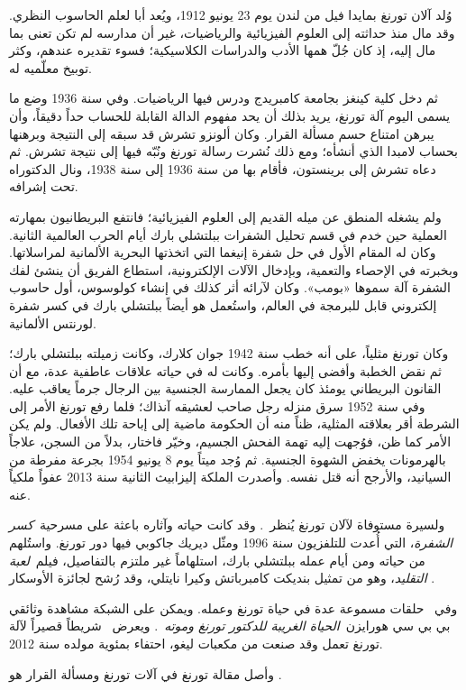 \documentclass[../../../include/open-logic-section]{subfiles}
\begin{document}


وُلد آلان تورنغ بمايدا فيل من لندن يوم 23 يونيو 1912، ويُعد أبا لعلم
الحاسوب النظري. وقد مال منذ حداثته إلى العلوم الفيزيائية والرياضيات، غير
أن مدارسه لم تكن تعنى بما مال إليه، إذ كان جُلّ همها الأدب والدراسات
الكلاسيكية؛ فسوء تقديره عندهم، وكثر توبيخ معلّميه له.


ثم دخل كلية كينغز بجامعة كامبريدج ودرس فيها الرياضيات. وفي سنة 1936 وضع
ما يسمى اليوم آلة تورنغ، يريد بذلك أن يحد مفهوم الدالة القابلة للحساب حداً
دقيقاً، وأن يبرهن امتناع حسم مسألة القرار. وكان ألونزو تشرش قد سبقه إلى
النتيجة وبرهنها بحساب لامبدا الذي أنشأه؛ ومع ذلك نُشرت رسالة تورنغ ونُبّه
فيها إلى نتيجة تشرش. ثم دعاه تشرش إلى برينستون، فأقام بها من سنة 1936 إلى
سنة 1938، ونال الدكتوراه تحت إشرافه.

ولم يشغله المنطق عن ميله القديم إلى العلوم الفيزيائية؛ فانتفع البريطانيون
بمهارته العملية حين خدم في قسم تحليل الشفرات ببلتشلي بارك أيام الحرب
العالمية الثانية. وكان له المقام الأول في حل شفرة إنيغما التي اتخذتها
البحرية الألمانية لمراسلاتها. وبخبرته في الإحصاء والتعمية، وبإدخال الآلات
الإلكترونية، استطاع الفريق أن ينشئ لفك الشفرة آلة سموها «بومب». وكان
لآرائه أثر كذلك في إنشاء كولوسوس، أول حاسوب إلكتروني قابل للبرمجة في
العالم، واستُعمل هو أيضاً ببلتشلي بارك في كسر شفرة لورنتس الألمانية.

وكان تورنغ مثلياً، على أنه خطب سنة 1942 جوان كلارك، وكانت زميلته ببلتشلي
بارك؛ ثم نقض الخطبة وأفضى إليها بأمره. وكانت له في حياته علاقات عاطفية
عدة، مع أن القانون البريطاني يومئذ كان يجعل الممارسة الجنسية بين الرجال
جرماً يعاقب عليه. وفي سنة 1952 سرق منزله رجل صاحب لعشيقه آنذاك؛ فلما رفع
تورنغ الأمر إلى الشرطة أقر بعلاقته المثلية، ظناً منه أن الحكومة ماضية إلى
إباحة تلك الأفعال. ولم يكن الأمر كما ظن، فوُجهت إليه تهمة الفحش الجسيم،
وخيّر فاختار، بدلاً من السجن، علاجاً بالهرمونات يخفض الشهوة الجنسية. ثم
وُجد ميتاً يوم 8 يونيو 1954 بجرعة مفرطة من السيانيد، والأرجح أنه قتل نفسه.
وأصدرت الملكة إليزابيث الثانية سنة 2013 عفواً ملكياً عنه.

\begin{reading}
ولسيرة مستوفاة لآلان تورنغ يُنظر~\citet{Hodges2014}. وقد كانت حياته وآثاره
باعثة على مسرحية~\emph{كسر الشفرة}، التي أُعدت للتلفزيون سنة 1996 ومثّل
ديريك جاكوبي فيها دور تورنغ. واستُلهم من حياته ومن أيام عمله ببلتشلي بارك،
استلهاماً غير ملتزم بالتفاصيل، فيلم~\emph{لعبة التقليد}، وهو من تمثيل
بنديكت كامبرباتش وكيرا نايتلي، وقد رُشح لجائزة الأوسكار
\citep{Imitation2014}.

وفي~\citet{Radiolab2012} حلقات مسموعة عدة في حياة تورنغ وعمله. ويمكن على
الشبكة مشاهدة وثائقي بي بي سي هورايزن~\emph{الحياة الغريبة للدكتور
  تورنغ وموته}~\citep{Sykes1992}. ويعرض~\citep{Theelen2012} شريطاً قصيراً
لآلة تورنغ تعمل وقد صنعت من مكعبات ليغو، احتفاء بمئوية مولده سنة 2012.

وأصل مقالة تورنغ في آلات تورنغ ومسألة القرار هو \citet{Turing1937}.
\end{reading}
\end{document}
